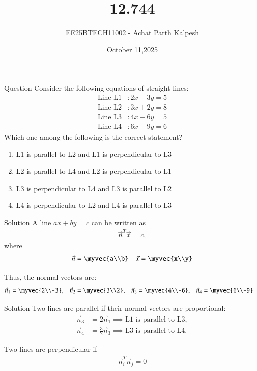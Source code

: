\documentclass{beamer}
\title %
{12.744}
\date{October 11,2025}
\author %
{EE25BTECH11002 - Achat Parth Kalpesh}
\begin{document}
\frame{\titlepage}

\begin{frame}{Question}
Consider the following equations of straight lines:
\begin{align*}
	\text{Line L1} &\colon 2x - 3y = 5 \\
	\text{Line L2} &\colon 3x + 2y = 8 \\
	\text{Line L3} &\colon 4x - 6y = 5 \\
	\text{Line L4} &\colon 6x - 9y = 6
\end{align*}
Which one among the following is the correct statement?
\begin{enumerate}
	\item L1 is parallel to L2 and L1 is perpendicular to L3
	\item L2 is parallel to L4 and L2 is perpendicular to L1
	\item L3 is perpendicular to L4 and L3 is parallel to L2
	\item L4 is perpendicular to L2 and L4 is parallel to L3
\end{enumerate}
\end{frame}

\begin{frame}{Solution}
A line $ax + by = c$ can be written as
\begin{align}
\vec{n}^T \vec{x} = c,
\end{align}
where
\begin{align}
\vec{n} = \myvec{a\\b} \quad
\vec{x} = \myvec{x\\y}
\end{align}

Thus, the normal vectors are:
\begin{align}
\vec{n}_1 &= \myvec{2\\-3}, &
\vec{n}_2 &= \myvec{3\\2}, &
\vec{n}_3 &= \myvec{4\\-6}, &
\vec{n}_4 &= \myvec{6\\-9}
\end{align}
\end{frame}



\begin{frame}{Solution}
Two lines are parallel if their normal vectors are proportional:
\begin{align}
\vec{n}_3 &= 2 \vec{n}_1 \implies \text{L1 is parallel to L3}, \\
\vec{n}_4 &= \frac{3}{2} \vec{n}_3 \implies \text{L3 is parallel to L4}.
\end{align}

Two lines are perpendicular if
\begin{align}
\vec{n}_i^T \vec{n}_j = 0
\end{align}
\end{frame}
\end{document}
